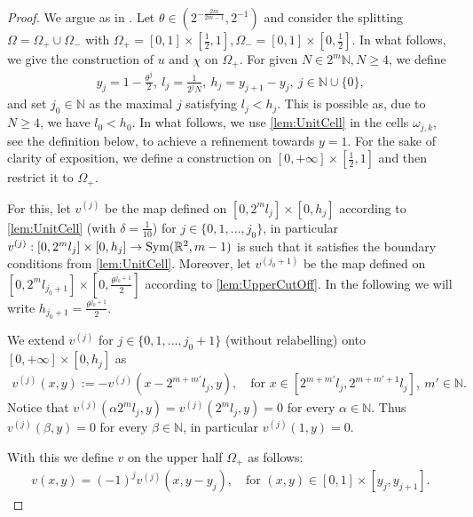 \documentclass[a4paper, 10pt, twoside, notitlepage]{amsart}
\theoremstyle{plain}
\newcommand{\R}{\mathbb{R}}
\newcommand{\N}{\mathbb{N}}
\begin{document}
		\begin{proof}
			We argue as in \cite{CC15,RRT23,RT22}.  Let $\theta \in (2^{-\frac{2m}{2m-1}},2^{-1})$ and consider the splitting $\Omega = \Omega_+ \cup \Omega_-$ with
			$\Omega_+ = [0,1] \times [\frac{1}{2},1], \Omega_- = [0,1] \times [0,\frac{1}{2}]$.  In what follows, we give the construction of $u$ and $\chi$ on $\Omega_+$.  For given $N \in 2^m\N, N \geq 4$, we
			define
			\begin{align*}
				y_j = 1 - \frac{\theta^j}{2}, \ l_j = \frac{1}{2^jN}, \ h_j = y_{j+1} - y_j, \ j \in \N \cup \{0\},
			\end{align*}
			and set $j_0 \in \N$ as the maximal $j$ satisfying $l_j < h_j$. This is possible as, due to $N \geq 4$, we have $l_0 < h_0$.  In what follows, we use \cref{lem:UnitCell} in the cells $\omega_{j,k}$, see the definition below, to achieve a
			refinement towards $y = 1$.
For the sake of clarity of exposition, we define a construction on $[0,+\infty]\times[\frac{1}{2},1]$ and then restrict it to $\Omega_+$.
			
For this, let $v^{(j)}$ be the map defined on $[0,2^ml_j] \times [0,h_j]$ according to \cref{lem:UnitCell} (with $\delta = \frac{1}{10}$) for $j \in\{0,1,\dots,j_0\}$, in particular $v^{(j)}:[0,2^ml_j] \times [0,h_j] \rightarrow \textup{Sym}(\R^2, m-1)$ is such that it satisfies the boundary conditions from \cref{lem:UnitCell}. Moreover, let $v^{(j_0+1)}$ be the map defined on $[0,2^m l_{j_0+1}] \times [0,\frac{\theta^{j_0+1}}{2}]$ according to \cref{lem:UpperCutOff}. In the following we will write $h_{j_0+1} = \frac{\theta^{j_0+1}}{2}$.
                            
We extend $v^{(j)}$ for $j\in \{0,1,\dots,j_0+1\}$ (without relabelling) onto $[0,+\infty] \times [0,h_j]$ as
\begin{align*}
v^{(j)}(x,y):=-v^{(j)}(x-2^{m+m'}l_j,y), \quad \text{for } x\in[2^{m+m'}l_j,2^{m+m'+1}l_j], \ m'\in\N.
\end{align*}
Notice that $v^{(j)}(\alpha2^{m}l_j,y)=v^{(j)}(2^ml_j,y)=0$ for every $\alpha\in\N$.
Thus $v^{(j)}(\beta,y)=0$ for every $\beta\in\N$, in particular $v^{(j)}(1,y)=0$.

 
			
			With this we define $v$ on the upper half $\Omega_+$ as follows:
			\begin{align*}
				v(x,y) = (-1)^{j} v^{(j)}(x,y-y_j), \quad \text{for } (x,y) \in [0,1]\times[y_j,y_{j+1}].
			\end{align*}


\end{proof}
\end{document}
